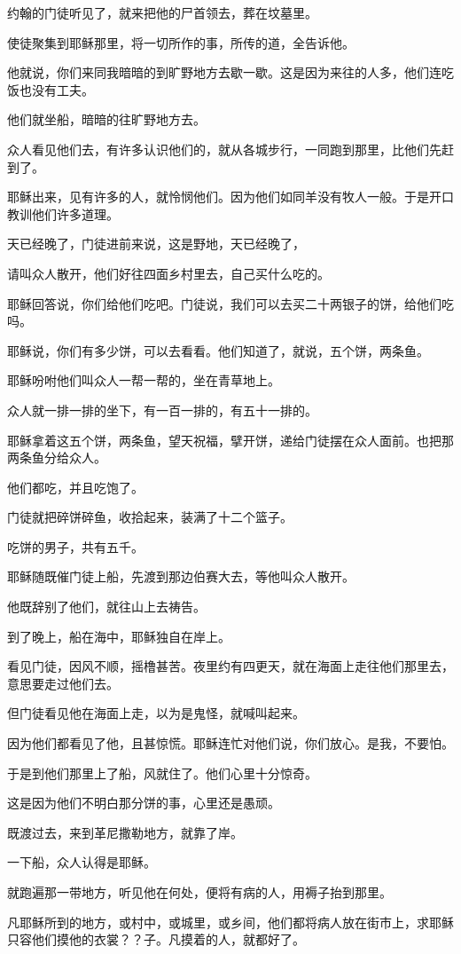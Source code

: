 \documentclass[12pt,oneside]{book}
\begin{document}
约翰的门徒听见了，就来把他的尸首领去，葬在坟墓里。

使徒聚集到耶稣那里，将一切所作的事，所传的道，全告诉他。

他就说，你们来同我暗暗的到旷野地方去歇一歇。这是因为来往的人多，他们连吃饭也没有工夫。

他们就坐船，暗暗的往旷野地方去。

众人看见他们去，有许多认识他们的，就从各城步行，一同跑到那里，比他们先赶到了。

耶稣出来，见有许多的人，就怜悯他们。因为他们如同羊没有牧人一般。于是开口教训他们许多道理。

天已经晚了，门徒进前来说，这是野地，天已经晚了，

请叫众人散开，他们好往四面乡村里去，自己买什么吃的。

耶稣回答说，你们给他们吃吧。门徒说，我们可以去买二十两银子的饼，给他们吃吗。

耶稣说，你们有多少饼，可以去看看。他们知道了，就说，五个饼，两条鱼。

耶稣吩咐他们叫众人一帮一帮的，坐在青草地上。

众人就一排一排的坐下，有一百一排的，有五十一排的。

耶稣拿着这五个饼，两条鱼，望天祝福，擘开饼，递给门徒摆在众人面前。也把那两条鱼分给众人。

他们都吃，并且吃饱了。

门徒就把碎饼碎鱼，收拾起来，装满了十二个篮子。

吃饼的男子，共有五千。

耶稣随既催门徒上船，先渡到那边伯赛大去，等他叫众人散开。

他既辞别了他们，就往山上去祷告。

到了晚上，船在海中，耶稣独自在岸上。

看见门徒，因风不顺，摇橹甚苦。夜里约有四更天，就在海面上走往他们那里去，意思要走过他们去。

但门徒看见他在海面上走，以为是鬼怪，就喊叫起来。

因为他们都看见了他，且甚惊慌。耶稣连忙对他们说，你们放心。是我，不要怕。

于是到他们那里上了船，风就住了。他们心里十分惊奇。

这是因为他们不明白那分饼的事，心里还是愚顽。

既渡过去，来到革尼撒勒地方，就靠了岸。

一下船，众人认得是耶稣。

就跑遍那一带地方，听见他在何处，便将有病的人，用褥子抬到那里。

凡耶稣所到的地方，或村中，或城里，或乡间，他们都将病人放在街市上，求耶稣只容他们摸他的衣裳？？子。凡摸着的人，就都好了。
\end{document}
